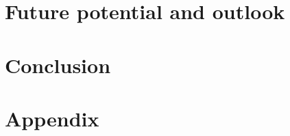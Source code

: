 \documentclass[12pt, a4paper]{article}
\begin{document}
\section{Future potential and outlook}\label{sec::outlook}
\section{Conclusion}\label{sec::conclusion}

\newpage
\renewcommand{\thesubsection}{\Alph{subsection}}
\setcounter{page}{\value{lastroman}}
\section*{Appendix}


\newpage


\newpage
\listoffigures
\listoftables



% 


\end{document}
